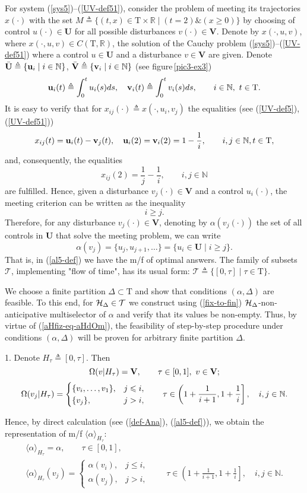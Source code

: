 \documentclass[sn-mathphys,Numbered,pdflatex]{sn-jnl}%
\theoremstyle{thmstyleone}%
\theoremstyle{thmstyletwo}%
\theoremstyle{thmstylethree}%
\renewcommand{\ge}{\geqslant}%
\renewcommand{\le}{\leqslant}%
\newcommand{\myand}{\ensuremath{\mathrel{\&}}}%
\newcommand{\beq}{\begin{equation}}
\newcommand{\eeq}{\end{equation}}
\newcommand{\mydef}{\mathrel{\triangleq}}%
\newcommand{\res}[2]{\ensuremath{(#1|#2)}}%
\newcommand{\RA}{\ensuremath{\mathbb R}}%
\newcommand{\NA}{\ensuremath{\mathbb N}}%
\newcommand{\naOm}{\ensuremath{\Omega}}%
\newcommand{\naT}{\ensuremath{\mathrm{T}}}%
\newcommand{\naTc}{\ensuremath{\mathcal{T}}}%
\newcommand{\naOmo}[2]{\naOm\setbox0=\hbox{\text{$#1$}}\ifdim\wd0=0pt\else\res{#1}{#2}\fi}%
\newcommand{\Ana}[2]{\ensuremath{\langle{#1}\rangle_{#2}}}%
\newcommand{\UB}{{\mathbf U}}%
\newcommand{\VB}{{\mathbf V}}%
\newcommand{\UBB}{{\bar{\mathbf U}}}%
\newcommand{\VBB}{{\bar{\mathbf V}}}%
\newcommand{\fref}[1]{{\rm(\ref{#1})}}   %
\begin{document}
For system \fref{sys5}--\fref{UV-def51}, consider the problem of meeting its trajectories $x(\cdot)$ with the set $M\mydef\{(t,x)\in\naT\times\RA\mid (t=2)\myand (x\ge0)\}$ by choosing of control $u(\cdot)\in\UB$ for all possible disturbances $v(\cdot)\in\VB$.
Denote by $x(\cdot,u,v)$, where $x(\cdot,u,v)\in C(\naT,\RA)$, the solution of the Cauchy problem \fref{sys5}--\fref{UV-def51} where a control $u\in\UB$ and a disturbance $v\in\VB$ are given.
Denote $\UBB\mydef\{{\bf u}_i\mid i\in\NA\}$, $\VBB\mydef\{{\bf v}_i\mid i\in\NA\}$ (see figure\,\ref{pic3-ex3})
$$
{\bf u}_i(t)\mydef\int_{0}^{t}u_i(s)ds,\quad{\bf v}_i(t)\mydef\int_{0}^{t}v_i(s)ds,\qquad i\in\NA,\ t\in\naT.
$$
It is easy to verify that for $x_{ij}(\cdot)\mydef x(\cdot,u_i,v_j)$ the equalities (see \fref{UV-def5}, \fref{UV-def51})
$$
x_{ij}(t)={\bf u}_i(t)-{\bf v}_j(t),\quad{\bf u}_i(2)={\bf v}_i(2)=1-\frac1i,\qquad i,j\in\NA, t\in\naT,
$$
and, consequently, the equalities
\beq\label{x-ij}
x_{ij}(2)=\frac1j-\frac1i,\qquad i,j\in\NA
\eeq
are fulfilled.
Hence, given a disturbance $v_j(\cdot)\in\VB$ and a control $u_i(\cdot)$, the meeting criterion can be written as the inequality
$$
i\ge j.
$$
Therefore, for any disturbance $v_j(\cdot)\in\VB$, denoting by $\alpha(v_j(\cdot))$ the set of all controls in $\UB$ that solve the meeting problem, we can write
\beq\label{al5-def}
\alpha(v_j)=\{u_j,u_{j+1},\ldots\}=\{u_i\in\UB\mid i\ge j\}.
\eeq
That is, in \fref{al5-def} we have the m/f of optimal answers.
The family of subsets $\naTc$, implementing "flow of time", has its usual form: $\naTc\mydef\{[0, \tau]\mid \tau\in\naT\}$.

We choose a finite partition $\Delta\subset\naT$ and show that conditions $(\alpha,\Delta)$ are feasible.
To this end, for ${\cal H}_\Delta\in\naTc$ we construct using \fref{fix-to-fin} ${\cal H}_\Delta$-non-anticipative multiselector of $\alpha$ and verify that its values be non-empty.
Thus, by virtue of \fref{aHfiz-eq-aHdOm}, the feasibility of step-by-step procedure under conditions $(\alpha,\Delta)$ will be proven for arbitrary finite partition $\Delta$.

1.
Denote $H_\tau\mydef[0,\tau]$.
Then
$$
\naOmo{v}{H_\tau}=\VB, \qquad \tau\in[0,1],\ v\in\VB;
$$
$$
\naOmo{v_j}{H_\tau}=
\begin{cases}
\{v_i,\ldots,v_1\},& j\le i,\\
\{v_j\},& j>i,
\end{cases}
\qquad \tau\in\left(1+\frac1{i+1},1+\frac1i\right],\quad i, j\in\NA.
$$


Hence, by direct calculation (see \fref{def-Ana}, \fref{al5-def}), we obtain the representation of m/f $\Ana{\alpha}{H_\tau}$:
\begin{gather}
\Ana{\alpha}{H_\tau}=\alpha, \qquad \tau\in[0,1],\label{ana-al0-ex5}\\
\Ana{\alpha}{H_\tau}(v_j)=
\begin{cases}
\alpha(v_i),&j\le i,\\
\alpha(v_j),&j>i,
\end{cases}
\qquad \tau\in\left(1+\frac1{i+1},1+\frac1i\right],\quad i, j\in\NA.\label{ana-al1-ex5}
\end{gather}
\end{document}
